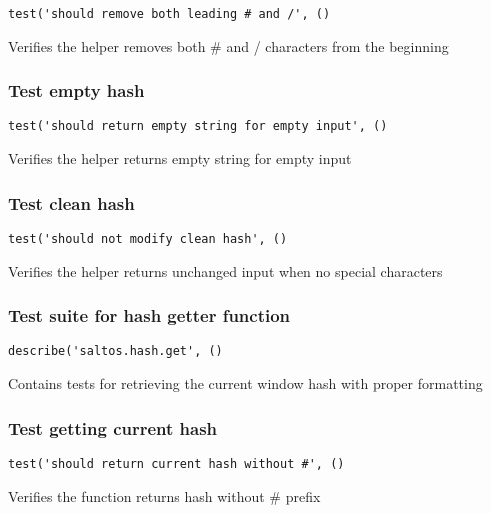 \documentclass[a4paper]{article}
\begin{document}
\begin{lstlisting}
test('should remove both leading # and /', ()
\end{lstlisting}

Verifies the helper removes both \# and / characters from the beginning

\hypertarget{toc633}{}
\subsubsection{Test empty hash}

\begin{lstlisting}
test('should return empty string for empty input', ()
\end{lstlisting}

Verifies the helper returns empty string for empty input

\hypertarget{toc634}{}
\subsubsection{Test clean hash}

\begin{lstlisting}
test('should not modify clean hash', ()
\end{lstlisting}

Verifies the helper returns unchanged input when no special characters

\hypertarget{toc635}{}
\subsubsection{Test suite for hash getter function}

\begin{lstlisting}
describe('saltos.hash.get', ()
\end{lstlisting}

Contains tests for retrieving the current window hash
with proper formatting

\hypertarget{toc636}{}
\subsubsection{Test getting current hash}

\begin{lstlisting}
test('should return current hash without #', ()
\end{lstlisting}

Verifies the function returns hash without \# prefix

\hypertarget{toc637}{}
\end{document}
